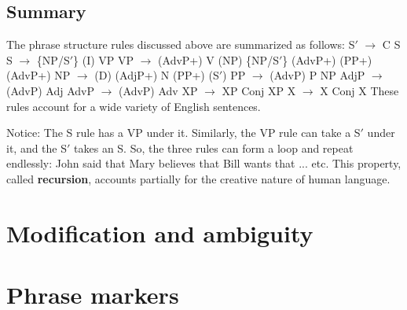 \subsection{Summary}
The phrase structure rules discussed above are summarized as follows:
\pex
\a S$'$ $\rightarrow$ C S
\a S $\rightarrow$ \{NP/S$'$\} (I) VP
\a VP $\rightarrow$ (AdvP+) V (NP) \{NP/S$'$\} (AdvP+) (PP+) (AdvP+)
\a NP $\rightarrow$ (D) (AdjP+) N (PP+) (S$'$)
\a PP $\rightarrow$ (AdvP) P NP
\a AdjP $\rightarrow$ (AdvP) Adj
\a AdvP $\rightarrow$ (AdvP) Adv
\a XP $\rightarrow$ XP Conj XP
\a X $\rightarrow$ X Conj X
\xe
These rules account for a wide variety of English sentences.

Notice: The S rule has a VP under it. Similarly, the VP rule can take a S$'$ under it, and the S$'$ takes an S. So, the three rules can form a loop and repeat endlessly:
\pex
John said that Mary believes that Bill wants that ... etc.
\xe
This property, called \textbf{recursion}, accounts partially for the creative nature of human language.


\section{Modification and ambiguity}


\section{Phrase markers}

















